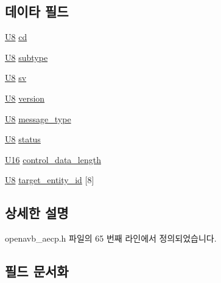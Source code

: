 \subsection*{데이타 필드}
\begin{DoxyCompactItemize}
\item 
\hyperlink{openavb__types__base__pub_8h_aa63ef7b996d5487ce35a5a66601f3e73}{U8} \hyperlink{structopenavb__aecp__control__header__t_ad2828a59ad0b95e77da38333c0a717de}{cd}
\item 
\hyperlink{openavb__types__base__pub_8h_aa63ef7b996d5487ce35a5a66601f3e73}{U8} \hyperlink{structopenavb__aecp__control__header__t_ad61c2796f8f447c2ca8979f4aeccf351}{subtype}
\item 
\hyperlink{openavb__types__base__pub_8h_aa63ef7b996d5487ce35a5a66601f3e73}{U8} \hyperlink{structopenavb__aecp__control__header__t_adc62d14194c9ab3aff5b994caef8bcb0}{sv}
\item 
\hyperlink{openavb__types__base__pub_8h_aa63ef7b996d5487ce35a5a66601f3e73}{U8} \hyperlink{structopenavb__aecp__control__header__t_ae5d1ca2d5099c6a5f760c897505cb11b}{version}
\item 
\hyperlink{openavb__types__base__pub_8h_aa63ef7b996d5487ce35a5a66601f3e73}{U8} \hyperlink{structopenavb__aecp__control__header__t_a5e8953d77df4508aa07ed906c5b19beb}{message\+\_\+type}
\item 
\hyperlink{openavb__types__base__pub_8h_aa63ef7b996d5487ce35a5a66601f3e73}{U8} \hyperlink{structopenavb__aecp__control__header__t_aa2ef32d18f7a5a009b93a17834fe3828}{status}
\item 
\hyperlink{openavb__types__base__pub_8h_a0a0a322d5fa4a546d293a77ba8b4a71f}{U16} \hyperlink{structopenavb__aecp__control__header__t_a6a26fcf01946013b206d67551ef6eb84}{control\+\_\+data\+\_\+length}
\item 
\hyperlink{openavb__types__base__pub_8h_aa63ef7b996d5487ce35a5a66601f3e73}{U8} \hyperlink{structopenavb__aecp__control__header__t_ae1b176653a5c7930b960fd063409cf37}{target\+\_\+entity\+\_\+id} \mbox{[}8\mbox{]}
\end{DoxyCompactItemize}


\subsection{상세한 설명}


openavb\+\_\+aecp.\+h 파일의 65 번째 라인에서 정의되었습니다.



\subsection{필드 문서화}
